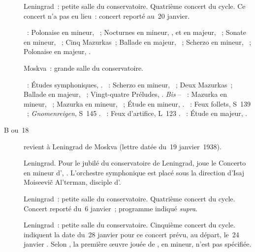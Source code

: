 \begin{description}
 \item[]
 Leningrad~: petite salle du conservatoire.
 Quatrième concert du cycle.
 Ce concert n'a pas eu lieu~: concert reporté au~20 janvier.

 \textsc{\Chopin{}}~: Polonaise en \kC \Sharp mineur,  ~;
 Nocturnes en \kC \Sharp mineur,  , et en \kF \Sharp
 majeur,  ~; Sonate en \kB \Flat mineur, ~; Cinq
 Mazurkas~; Ballade en \kA \Flat majeur, ~; Scherzo en \kB \Flat
 mineur, ~; Polonaise en \kA \Flat majeur, .
 \item[]
 Moskva~: grande salle du conservatoire.

 \textsc{\Schumann{}}~: Études symphoniques, .
 \textsc{\Chopin{}}~: Scherzo en \kB \Flat mineur, ~; Deux
 Mazurkas~; Ballade en \kA \Flat majeur, ~; Vingt-quatre Préludes,
 .
 \emph{Bis} -- \textsc{\Chopin{}}~: Mazurka en \kE mineur, 
 ~; Mazurka en \kF mineur,  ~; Étude en \kC
 \Sharp mineur,  .
 \textsc{\Liszt{}}~: Feux follets, S~139 ~; \emph{Gnomenreigen},
 S~145 .
 \textsc{\Debussy{}}~: Feux d'artifice, L~123 .
 \textsc{\Scriabine{}}~: Étude en \kD \Flat majeur,  .
 \item[B ou~18]
 \VSofronitsky{} revient à Leningrad de Moskva (lettre datée du~19
 janvier~1938).
 \item[]
 Leningrad.
 Pour le jubilé du conservatoire de Leningrad, \VSofronitsky{} joue le
 Concerto en \kD mineur d'\ARubinstein{}, .
 L'orchestre symphonique est placé sous la direction d'\hbox{Isaj} Moiseevič
 Al'terman, disciple d'\AGauk{}.
 \item[]
 Leningrad~: petite salle du conservatoire.
 Quatrième concert du cycle.
 Concert reporté du~6 janvier~; programme indiqué \emph{supra}.
 \item[]
 Leningrad~: petite salle du conservatoire.
 Cinquième concert du cycle.
 \citet[p.~411]{Scriabine} indiquent la date du~28 janvier pour ce concert
 prévu, au départ, le~24 janvier \citep[voir][p.~158]{Nekrasova08}.
 Selon \citeauthor{Nekrasova08}, la première œuvre jouée de \Liszt{}, en \kE
 mineur, n'est pas spécifiée.


\end{description}
